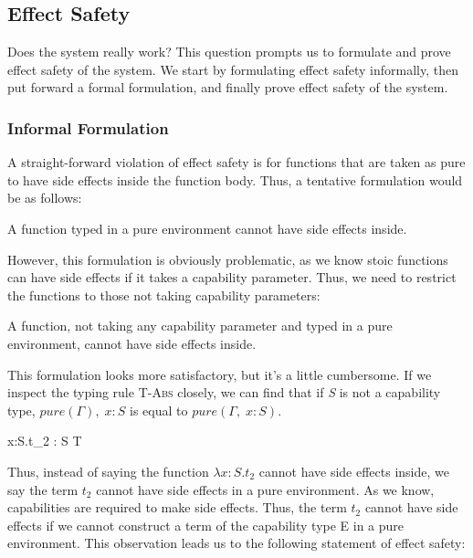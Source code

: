 \subsection{Effect Safety}

Does the system really work? This question prompts us to formulate and
prove effect safety of the system. We start by formulating effect
safety informally, then put forward a formal formulation, and finally
prove effect safety of the system.

\subsubsection{Informal Formulation}

A straight-forward violation of effect safety is for functions that
are taken as pure to have side effects inside the function body. Thus,
a tentative formulation would be as follows:

\begin{definition}
A function typed in a pure environment cannot have side effects inside.
\end{definition}

However, this formulation is obviously problematic, as we know stoic
functions can have side effects if it takes a capability
parameter. Thus, we need to restrict the functions to those not taking
capability parameters:

\begin{definition}
  A function, not taking any capability parameter and typed in a pure
  environment, cannot have side effects inside.
\end{definition}

This formulation looks more satisfactory, but it's a little
cumbersome. If we inspect the typing rule \textsc{T-Abs} closely, we
can find that if \emph{S} is not a capability type,
$pure(\Gamma),\; x: S$ is equal to $pure(\Gamma,\; x: S)$.

{ \Gamma \vdash \lambda x:S.\;t_2 : S \to T }

Thus, instead of saying the function $\lambda x:S.t_2$ cannot have
side effects inside, we say the term $t_2$ cannot have side effects in
a pure environment. As we know, capabilities are required to make side
effects. Thus, the term $t_2$ cannot have side effects if we cannot
construct a term of the capability type E in a pure environment. This
observation leads us to the following statement of effect safety:

